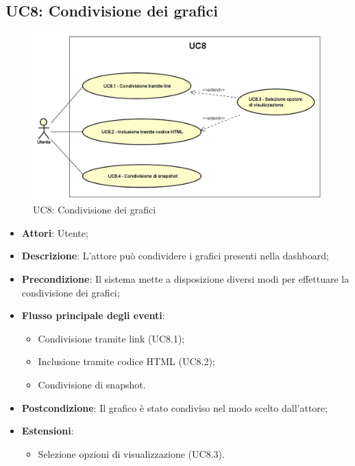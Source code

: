 \subsection{UC8: Condivisione dei grafici}
\hypertarget{UC8}{}
\begin{figure} [H]
	\centering
	\includegraphics[scale=0.45]{Img/UC8}
	\caption{UC8: Condivisione dei grafici}\label{}
\end{figure}
\begin{itemize}
	\item \textbf{Attori}: Utente;
	\item \textbf{Descrizione}: L'attore può condividere i grafici presenti nella dashboard;
	\item \textbf{Precondizione}: Il sistema mette a disposizione diversi modi per effettuare la condivisione dei grafici;
	\item \textbf{Flusso principale degli eventi}:
	\begin{itemize}
		\item Condivisione tramite link (UC8.1);
		\item Inclusione tramite codice HTML (UC8.2);	
		\item Condivisione di snapshot.
	\end{itemize}
	\item \textbf{Postcondizione}: Il grafico è stato condiviso nel modo scelto dall'attore;
	\item \textbf{Estensioni}:
	\begin{itemize}
		\item Selezione opzioni di visualizzazione (UC8.3).
	\end{itemize}
		
\end{itemize}

